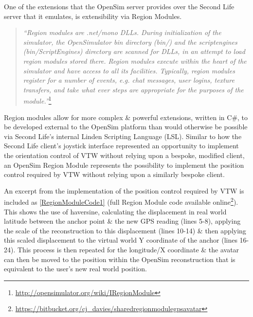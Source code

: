 \label{regionModule}

\newcommand{\RegionModuleFootnote}{\footnote{\url{http://opensimulator.org/wiki/IRegionModule}}}

\newcommand{\RegionModuleCodeFootnote}{\footnote{\url{https://bitbucket.org/cj_davies/sharedregionmodulegpsavatar}}}


One of the extensions that the OpenSim server provides over the Second Life server that it emulates, is extensibility via Region Modules.

\begin{quotation}
	\textit{``Region modules are .net/mono DLLs. During initialization of the simulator, the OpenSimulator bin directory (bin/) and the scriptengines (bin/ScriptEngines) directory are scanned for DLLs, in an attempt to load region modules stored there. Region modules execute within the heart of the simulator and have access to all its facilities. Typically, region modules register for a number of events, e.g. chat messages, user logins, texture transfers, and take what ever steps are appropriate for the purposes of the module.''}\RegionModuleFootnote{}
\end{quotation}

Region modules allow for more complex \& powerful extensions, written in C\#, to be developed external to the OpenSim platform than would otherwise be possible via Second Life's internal Linden Scripting Language (LSL). Similar to how the Second Life client's joystick interface represented an opportunity to implement the orientation control of VTW without relying upon a bespoke, modified client, an OpenSim Region Module represents the possibility to implement the position control required by VTW without relying upon a similarly bespoke client.

An excerpt from the implementation of the position control required by VTW is included as \ref{RegionModuleCode1} (full Region Module code available online\RegionModuleCodeFootnote{}). This shows the use of haversine, calculating the displacement in real world latitude between the anchor point \& the new GPS reading (lines 5-8), applying the scale of the reconstruction to this displacement (lines 10-14) \& then applying this scaled displacement to the virtual world Y coordinate of the anchor (lines 16-24). This process is then repeated for the longitude/X coordinate \& the avatar can then be moved to the position within the OpenSim reconstruction that is equivalent to the user's new real world position.

